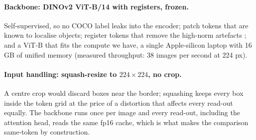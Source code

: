 \documentclass[10pt,letterpaper,twocolumn]{article}
\begin{document}
\paragraph{Backbone: DINOv2 ViT-B/14 with registers, frozen.}
Self-supervised, so no COCO label leaks into the encoder; patch tokens that are known to
localise objects; register tokens that remove the high-norm artefacts
\citep{darcet2024registers}; and a ViT-B that fits the compute we have, a single
Apple-silicon laptop with 16 GB of unified memory (measured throughput: 38 images per second at 224 px).

\paragraph{Input handling: squash-resize to $224\times224$, no crop.}
A centre crop would discard boxes near the border; squashing keeps every box inside the token
grid at the price of a distortion that affects every read-out equally. The backbone runs once
per image and every read-out, including the attention head, reads the same fp16 cache, which
is what makes the comparison same-token by construction.
\end{document}
